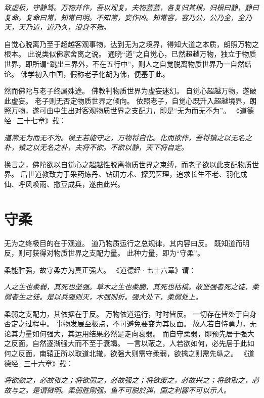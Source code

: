 \documentclass[11pt]{article}
\begin{document}
\textit{致虚极，守静笃。万物并作，吾以观复。夫物芸芸，各复归其根。归根曰静，静曰复命。复命曰常，知常曰明。不知常，妄作凶。知常容，容乃公，公乃全，全乃天，天乃道，道乃久，没身不殆。}

\newline

自觉心脱离乃至于超越客观事物，达到无为之境界，得知大道之本质，朗照万物之根本。
此说类似佛家舍离之说。
通晓“道”之自觉心，已然超越万物，独立于物质世界，即所谓“跳出三界外，不在五行中”，则人之自觉脱离物质世界乃一自然结论。
佛学初入中国，假称老子化胡为佛，便基于此。

\newline

然而佛陀与老子终属殊途。
佛教判物质世界为虚妄迷幻。
自觉心超越万物，遂破此虚妄。
老子则无否定物质世界之倾向。
依照老子，自觉心既升入超越境界，朗照万物，遂可由中生出对客观物质世界之支配力，即是“无为而无不为”。
《道德经·三十七章》载：

\textit{道常无为而无不为。侯王若能守之，万物将自化。化而欲作，吾将镇之以无名之朴，镇之以无名之朴，夫将不欲。不欲以静，天下将自定。} 

换言之，佛陀欲以自觉心之超越性脱离物质世界之束缚，而老子欲以此支配物质世界。
后世道教致力于采药炼丹、钻研方术、探究医理，追求长生不老、羽化成仙、呼风唤雨、撒豆成兵，遂由此兴。
  
\section{守柔}
无为之终极目的在于观道。
道乃物质运行之总规律，其内容曰反。
既知道而明反，则可获得对物质世界之支配力量。
此种力量，即为“守柔”。

\newline

柔能胜强，故守柔方为真正强大。
《道德经·七十六章》谓：

\textit{人之生也柔弱，其死也坚强。草木之生也柔脆，其死也枯槁。故坚强者死之徒，柔弱者生之徒。是以兵强则灭，木强则折。强大处下，柔弱处上。}

\newline

柔弱之支配力，其依据在于反。
万物依道运行，时时皆反。
一切存在皆处于自身否定之过程中。
事物发展至极点，不可避免要变为其反面。
故人若自恃勇力，无论其力量如何强大，其运用结果必然是走向衰弱。
而自守柔弱，即预先居于强大之反面，自然逐渐强大而不至于衰竭。
一言以蔽之，人若欲如何，必先居于此如何之反面，南辕正所以取道北辙，欲强大则需守柔弱，欲擒之则需先纵之。
《道德经·三十六章》载：

\textit{将欲歙之，必故张之；将欲弱之，必故强之；将欲废之，必故兴之；将欲取之，必故与之。是谓微明。柔弱胜刚强。鱼不可脱於渊，国之利器不可以示人。}
  
\end{document}
